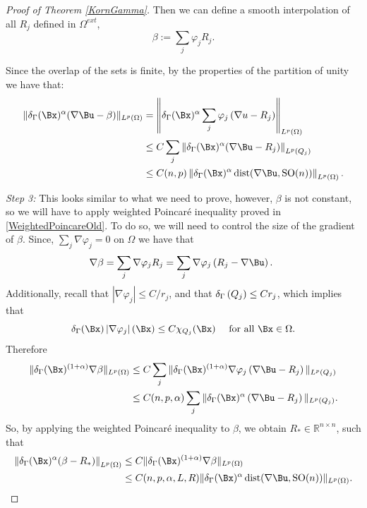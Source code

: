 \begin{proof}[Proof of Theorem \ref{KornGamma}]
Then we can define  a smooth interpolation  of all $R_j$ defined in $\Omega^{ext}$, $$\beta:=\sum_j \varphi_j R_j.$$ 

Since the overlap of the sets is finite, by the properties of the partition of unity we have that:
\begin{align*}
\|\delta_\GG(\Bx)^\alpha(\nabla \Bu-\beta)\|_{L^p(\Omega)}&=\left\|\delta_\GG(\Bx)^\alpha\sum_j \varphi_j\left(\nabla u-R_j\right)\right\|_{L^p(\Omega)} \\ &\leq C \sum_j\left\|\delta_\GG(\Bx)^\alpha(\nabla \Bu-R_j)\right\|_{L^p\left(Q_j\right)} \\
& \leq  C(n,p) \left\|\delta_\GG(\Bx)^\alpha \operatorname{dist}(\nabla \Bu, \mathrm{SO}(n))\right\|_{L^p\left(\Omega\right)} .
\end{align*}

\textit{Step 3:} This looks similar to what we need to prove, however, $\beta$ is not constant, so we will have to apply weighted Poincaré inequality proved in  \ref{WeightedPoincareOld}. To do so, we will need to control the size of the gradient of $\beta$. Since, $\sum_j \nabla \varphi_j=0$ on $\Omega$ we have that
$$
\nabla \beta=\sum_j \nabla \varphi_j R_j=\sum_j \nabla \varphi_j\left(R_j-\nabla \Bu\right) \text {. }
$$
Additionally, recall that $\left|\nabla \varphi_j\right| \leq C / r_j$, and that $\delta_\Gamma\left(Q_j\right) \leq C r_j$, which implies that
$$
\delta_\GG(\Bx)\left|\nabla \varphi_j\right|(\Bx) \leq C \chi_{Q_j}(\Bx) \quad \text { for all } \Bx \in \Omega .
$$
Therefore
$$
\begin{aligned}
\|\delta_\GG(\Bx)^{(1+\alpha)}\nabla \beta\|_{L^p(\Omega)} & \leq C \sum_j \|\delta_\GG(\Bx)^{(1+\alpha)}\nabla \varphi_j\left(\nabla \Bu-R_j\right)\|_{L^p(Q_j)} \\
& \leq C(n,p,\alpha) \sum_j \|\delta_\GG(\Bx)^{\alpha}\left(\nabla \Bu-R_j\right)\|_{L^p(Q_j)}.
\end{aligned}
$$
So, by applying the weighted Poincaré inequality to $\beta$, we obtain  $R_* \in \mathbb{R}^{n \times n}$, such that
\begin{align*}
\left\|\delta_\GG(\Bx)^{\alpha}(\beta-R_*)\right\|_{L^p(\Omega)} &\leq C \|\delta_\GG(\Bx)^{(1+\alpha) }\nabla \beta\|_{L^p(\Omega)}\\
 &\leq C(n,p,\alpha,L,R)\|\delta_\GG(\Bx)^{\alpha}\operatorname{dist}(\nabla \Bu, \mathrm{SO}(n))\|_{L^p(\Omega)}.
\end{align*}


\end{proof}
